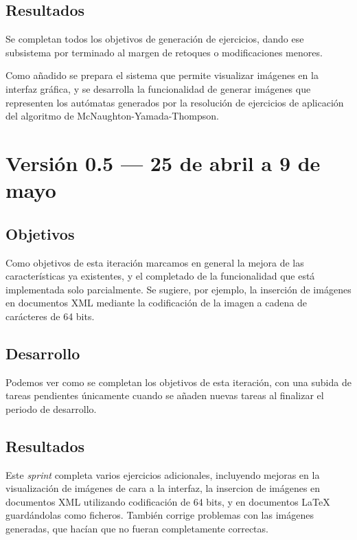 
\subsection{Resultados}
Se completan todos los objetivos de generación de ejercicios, dando ese subsistema por terminado al margen de retoques o modificaciones menores.

Como añadido se prepara el sistema que permite visualizar imágenes en la interfaz gráfica, y se desarrolla la funcionalidad de generar imágenes que representen los autómatas generados por la resolución de ejercicios de aplicación del algoritmo de McNaughton-Yamada-Thompson.

\section{Versión 0.5 --- 25 de abril a 9 de mayo}
\subsection{Objetivos}
Como objetivos de esta iteración marcamos en general la mejora de las características ya existentes, y el completado de la funcionalidad que está implementada solo parcialmente.
Se sugiere, por ejemplo, la inserción de imágenes en documentos XML mediante la codificación de la imagen a cadena de carácteres de 64 bits.

\subsection{Desarrollo}
Podemos ver como se completan los objetivos de esta iteración, con una subida de tareas pendientes únicamente cuando se añaden nuevas tareas al finalizar el periodo de desarrollo.


\subsection{Resultados}
Este \emph{sprint} completa varios ejercicios adicionales, incluyendo mejoras en la visualización de imágenes de cara a la interfaz, la insercion de imágenes en documentos XML utilizando codificación de 64 bits, y en documentos \LaTeX{} guardándolas como ficheros.
También corrige problemas con las imágenes generadas, que hacían que no fueran completamente correctas.

